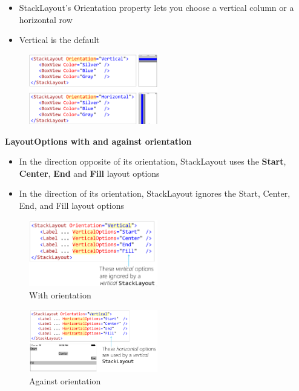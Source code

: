 \documentclass{article}
\newcommand{\bold}[1]{\textbf{#1}}
\begin{document}
\begin{itemize}
    \item StackLayout's Orientation property lets you choose a vertical column or a horizontal row
    \item Vertical is the default
\end{itemize}

\begin{figure}[H]
    \centering
    \includegraphics[width=0.5\textwidth]{xaml-stacklayout-orientation.png}
    \caption{}
\end{figure}

\bold{LayoutOptions with and against orientation}

\begin{itemize}
    \item In the direction opposite of its orientation, StackLayout uses the \bold{Start}, \bold{Center}, \bold{End} and \bold{Fill} layout options
    \item In the direction of its orientation, StackLayout ignores the Start, Center, End, and Fill layout options
\end{itemize}

\begin{figure}[H]
    \centering
    \includegraphics[width=0.5\textwidth]{xaml-stacklayout-orientation3.png}
    \caption{With orientation}
\end{figure}

\begin{figure}[H]
    \centering
    \includegraphics[width=0.5\textwidth]{xaml-stacklayout-orientation2.png}
    \caption{Against orientation}
\end{figure}
\end{document}
